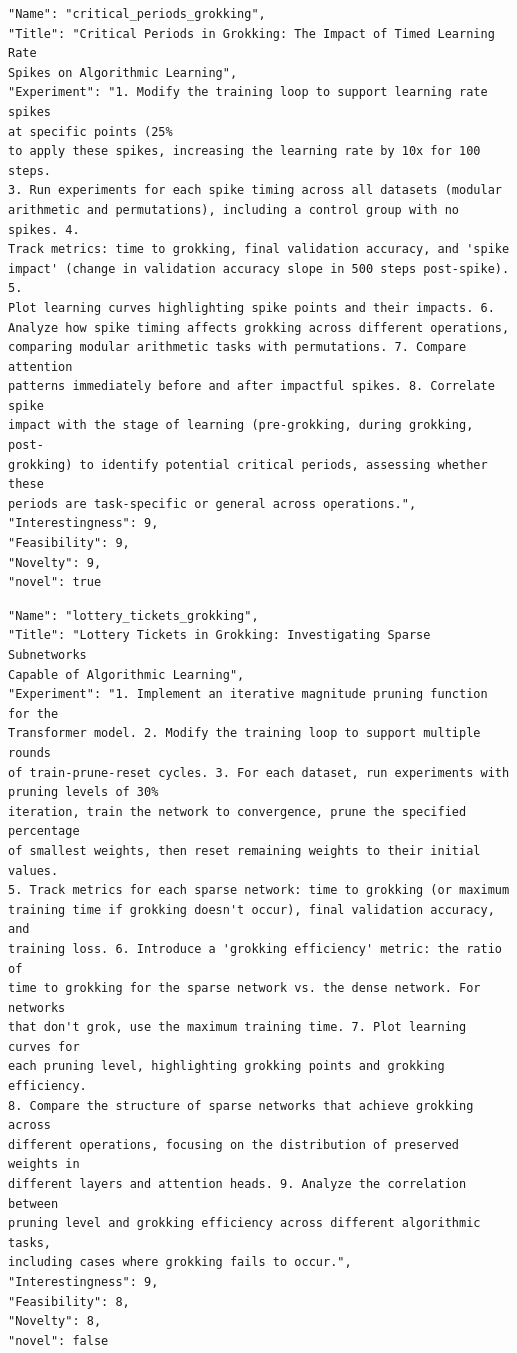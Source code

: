 \documentclass[11pt, a4paper]{include/gdm_format}
\begin{document}
\begin{tcolorbox}[breakable,colback=blue!5!white, colframe=blue!75!black, title=Idea 19/50 - \texttt{critical\_periods\_grokking}]
\small
\begin{verbatim}
"Name": "critical_periods_grokking",
"Title": "Critical Periods in Grokking: The Impact of Timed Learning Rate
Spikes on Algorithmic Learning",
"Experiment": "1. Modify the training loop to support learning rate spikes
at specific points (25%
to apply these spikes, increasing the learning rate by 10x for 100 steps.
3. Run experiments for each spike timing across all datasets (modular
arithmetic and permutations), including a control group with no spikes. 4.
Track metrics: time to grokking, final validation accuracy, and 'spike
impact' (change in validation accuracy slope in 500 steps post-spike). 5.
Plot learning curves highlighting spike points and their impacts. 6.
Analyze how spike timing affects grokking across different operations,
comparing modular arithmetic tasks with permutations. 7. Compare attention
patterns immediately before and after impactful spikes. 8. Correlate spike
impact with the stage of learning (pre-grokking, during grokking, post-
grokking) to identify potential critical periods, assessing whether these
periods are task-specific or general across operations.",
"Interestingness": 9,
"Feasibility": 9,
"Novelty": 9,
"novel": true
\end{verbatim}
\end{tcolorbox}

\begin{tcolorbox}[breakable,colback=blue!5!white, colframe=blue!75!black, title=Idea 20/50 - \texttt{lottery\_tickets\_grokking}]
\small
\begin{verbatim}
"Name": "lottery_tickets_grokking",
"Title": "Lottery Tickets in Grokking: Investigating Sparse Subnetworks
Capable of Algorithmic Learning",
"Experiment": "1. Implement an iterative magnitude pruning function for the
Transformer model. 2. Modify the training loop to support multiple rounds
of train-prune-reset cycles. 3. For each dataset, run experiments with
pruning levels of 30%
iteration, train the network to convergence, prune the specified percentage
of smallest weights, then reset remaining weights to their initial values.
5. Track metrics for each sparse network: time to grokking (or maximum
training time if grokking doesn't occur), final validation accuracy, and
training loss. 6. Introduce a 'grokking efficiency' metric: the ratio of
time to grokking for the sparse network vs. the dense network. For networks
that don't grok, use the maximum training time. 7. Plot learning curves for
each pruning level, highlighting grokking points and grokking efficiency.
8. Compare the structure of sparse networks that achieve grokking across
different operations, focusing on the distribution of preserved weights in
different layers and attention heads. 9. Analyze the correlation between
pruning level and grokking efficiency across different algorithmic tasks,
including cases where grokking fails to occur.",
"Interestingness": 9,
"Feasibility": 8,
"Novelty": 8,
"novel": false
\end{verbatim}
\end{tcolorbox}
\end{document}
